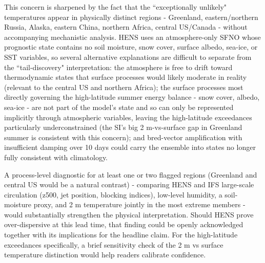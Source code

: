 \documentclass[11pt]{article}
\begin{document}
\begin{enumerate}
This concern is sharpened by the fact that the ``exceptionally unlikely" temperatures appear in physically distinct regions - Greenland, eastern/northern Russia, Alaska, eastern China, northern Africa, central US/Canada - without accompanying mechanistic analysis. HENS uses an atmosphere-only SFNO whose prognostic state contains no soil moisture, snow cover, surface albedo, sea-ice, or SST variables, so several alternative explanations are difficult to separate from the ``tail-discovery" interpretation: the atmosphere is free to drift toward thermodynamic states that surface processes would likely moderate in reality (relevant to the central US and northern Africa); the surface processes most directly governing the high-latitude summer energy balance - snow cover, albedo, sea-ice - are not part of the model's state and so can only be represented implicitly through atmospheric variables, leaving the high-latitude exceedances particularly underconstrained (the SI's big 2 m-vs-surface gap in Greenland summer is consistent with this concern); and bred-vector amplification with insufficient damping over 10 days could carry the ensemble into states no longer fully consistent with climatology.

A process-level diagnostic for at least one or two flagged regions (Greenland and central US would be a natural contrast) - comparing HENS and IFS large-scale circulation (z500, jet position, blocking indices), low-level humidity, a soil-moisture proxy, and 2 m temperature jointly in the most extreme members - would substantially strengthen the physical interpretation. Should HENS prove over-dispersive at this lead time, that finding could be openly acknowledged together with its implications for the headline claim. For the high-latitude exceedances specifically, a brief sensitivity check of the 2 m vs surface temperature distinction would help readers calibrate confidence.


\end{enumerate}
\end{document}
